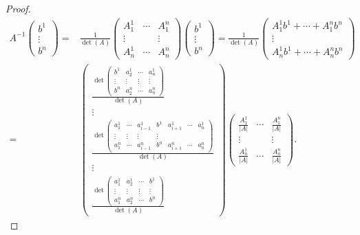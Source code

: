 \begin{proof}
\[
\begin{split}
	A^{-1}\begin{pmatrix} b^{1} \\ \vdots \\ b^{n} \end{pmatrix} = & \frac{1}{\det\left(A\right)}\begin{pmatrix} A^{1}_{1} & \cdots & A^{n}_{1} \\
\vdots & & \vdots \\
A^{1}_{n} & \cdots & A^{n}_{n}\end{pmatrix}\begin{pmatrix} b^{1} \\ \vdots \\ b^{n} \end{pmatrix} = \frac{1}{\det\left(A\right)}\begin{pmatrix} A^{1}_{1}b^{1} + \cdots + A^{n}_{1}b^{n} \\
\vdots \\
A^{1}_{n}b^{1} + \cdots + A^{n}_{n}b^{n}\end{pmatrix}\\
= & \begin{pmatrix} \frac{ \det\begin{pmatrix} b^{1} & a^{1}_{2} & \cdots & a^{1}_{n}\\
\vdots & \vdots & \vdots & \vdots \\
b^{n} & a^{n}_{2} & \cdots & a^{n}_{n}\end{pmatrix}}{\det\left(A\right)} \\ \vdots \\
		\frac{ \det\begin{pmatrix} a^{1}_{1} & \cdots& a^{1}_{i-1} & b^{1} & a^{1}_{i+1} & \cdots & a^{1}_{n}\\
\vdots & \vdots & \vdots & \vdots \\
 a^{n}_{1} & \cdots& a^{n}_{i-1} & b^{n} & a^{n}_{i+1} & \cdots & a^{n}_{n}\end{pmatrix}}{\det\left(A\right)} \\ \vdots \\ \frac{ \det\begin{pmatrix} a^{1}_{1} & a^{1}_{2} & \cdots & b^{1}\\
\vdots & \vdots & \vdots & \vdots \\
a^{n}_{1} & a^{n}_{2} & \cdots & b^{n}\end{pmatrix}}{\det\left(A\right)}\end{pmatrix} \begin{pmatrix} \frac{A^{1}_{1}}{ \left|A\right|} & \cdots & \frac{A^{n}_{1}}{ \left|A\right|} \\
\vdots & & \vdots \\
\frac{A^{1}_{n}}{ \left|A\right|} & \cdots & \frac{A^{n}_{n}}{ \left|A\right|}\end{pmatrix}.
\end{split}
\]
\end{proof}

